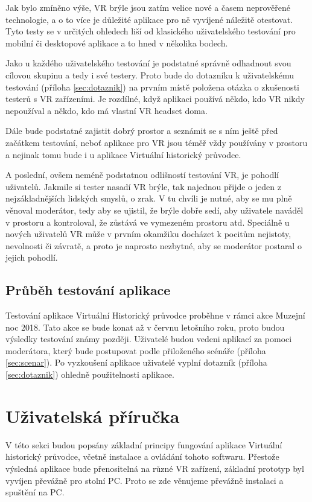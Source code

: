 \documentclass[thesis=B,czech]{FITthesis}[2012/06/26]
\begin{document}
	Jak bylo zmíněno výše, VR brýle jsou zatím velice nové a časem neprověřené technologie, a o to více je důležité aplikace pro ně vyvíjené náležitě otestovat. Tyto testy se v určitých ohledech liší od klasického uživatelského testování pro mobilní či desktopové aplikace a to hned v několika bodech.
	
	 Jako u každého uživatelského testování je podstatné správně odhadnout svou cílovou skupinu a tedy i své testery. Proto bude do dotazníku k uživatelskému testování (příloha \ref{sec:dotaznik}) na prvním místě položena otázka o zkušenosti testerů s VR zařízeními. Je rozdílné, když aplikaci používá někdo, kdo VR nikdy nepoužíval a někdo, kdo má vlastní VR headset doma.
	 
	 Dále bude podstatné zajistit dobrý prostor a seznámit se s ním ještě před začátkem testování, neboť aplikace pro VR jsou téměř vždy používány v prostoru a nejinak tomu bude i u aplikace Virtuální historický průvodce.
	 
	 A poslední, ovšem neméně podstatnou odlišností testování VR, je pohodlí uživatelů. Jakmile si tester nasadí VR brýle, tak najednou přijde o jeden z nejzákladnějších lidských smyslů, o zrak. V tu chvíli je nutné, aby se mu plně věnoval moderátor, tedy aby se ujistil, že brýle dobře sedí, aby uživatele naváděl v prostoru a kontroloval, že zůstává ve vymezeném prostoru atd. Speciálně u nových uživatelů VR může v prvním okamžiku docházet k pocitům nejistoty, nevolnosti či závratě, a proto je naprosto nezbytné, aby se moderátor postaral o jejich pohodlí. \cite{VRuse}
	
	\subsection{Průběh testování aplikace}
	
	Testování aplikace Virtuální Historický průvodce proběhne v rámci akce Muzejní noc 2018. Tato akce se bude konat až v červnu letošního roku, proto budou výsledky testování známy později. Uživatelé budou vedeni aplikací za pomoci moderátora, který bude postupovat podle přiloženého scénáře (příloha \ref{sec:scenar}). Po vyzkoušení aplikace uživatelé vyplní dotazník (příloha \ref{sec:dotaznik}) ohledně použitelnosti aplikace.

	\section{Uživatelská příručka}
	
	V této sekci budou popsány základní principy fungování aplikace Virtuální historický průvodce, včetně instalace a ovládání tohoto softwaru. Přestože výsledná aplikace bude přenositelná na různé VR zařízení, základní prototyp byl vyvíjen převážně pro stolní PC. Proto se zde věnujeme převážně instalaci a spuštění na PC.
\end{document}
